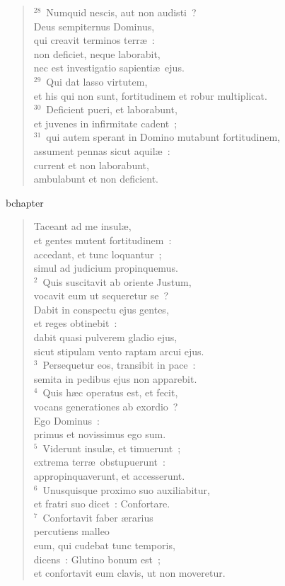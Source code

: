 \begin{verse}
${}^{28}$~Numquid nescis, aut non audisti~?\\ Deus sempiternus Dominus,\\ qui creavit terminos terr\ae~:\\ non deficiet, neque laborabit,\\ nec est investigatio sapienti\ae\ ejus.\\
${}^{29}$~Qui dat lasso virtutem,\\ et his qui non sunt, fortitudinem et robur multiplicat.\\
${}^{30}$~Deficient pueri, et laborabunt,\\ et juvenes in infirmitate cadent~;\\
${}^{31}$~qui autem sperant in Domino mutabunt fortitudinem,\\ assument pennas sicut aquil\ae~:\\ current et non laborabunt,\\ ambulabunt et non deficient.\end{verse}


bchapter\begin{verse}\vspace{-19pt}Taceant ad me insul\ae ,\\ et gentes mutent fortitudinem~:\\ accedant, et tunc loquantur~;\\ simul ad judicium propinquemus.\\
${}^{2}$~Quis suscitavit ab oriente Justum,\\ vocavit eum ut sequeretur se~?\\ Dabit in conspectu ejus gentes,\\ et reges obtinebit~:\\ dabit quasi pulverem gladio ejus,\\ sicut stipulam vento raptam arcui ejus.\\
${}^{3}$~Persequetur eos, transibit in pace~:\\ semita in pedibus ejus non apparebit.\\
${}^{4}$~Quis h\ae c operatus est, et fecit,\\ vocans generationes ab exordio~?\\ Ego Dominus~:\\ primus et novissimus ego sum.\\
${}^{5}$~Viderunt insul\ae , et timuerunt~;\\ extrema terr\ae\ obstupuerunt~:\\ appropinquaverunt, et accesserunt.\\
${}^{6}$~Unusquisque proximo suo auxiliabitur,\\ et fratri suo dicet~: Confortare.\\
${}^{7}$~Confortavit faber \ae rarius\\ percutiens malleo\\ eum, qui cudebat tunc temporis,\\ dicens~: Glutino bonum est~;\\ et confortavit eum clavis, ut non moveretur.\end{verse}


